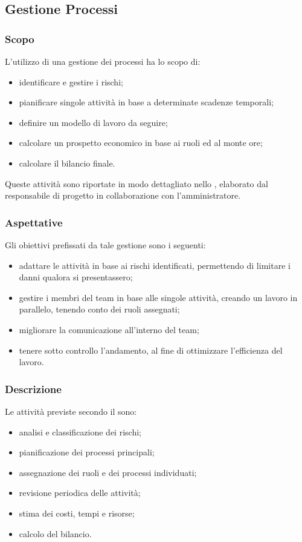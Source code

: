 \subsection{Gestione Processi}

	\subsubsection{Scopo}
	L'utilizzo di una gestione dei processi ha lo scopo di:
	\begin{itemize}
		\item identificare e gestire i rischi;
		\item pianificare singole attività in base a determinate scadenze temporali;
		\item definire un modello di lavoro da seguire;
		\item calcolare un prospetto economico in base ai ruoli ed al monte ore;
		\item calcolare il bilancio finale.
	\end{itemize}
	Queste attività sono riportate in modo dettagliato nello , elaborato dal responsabile di progetto in collaborazione con l'amministratore.
	
	\subsubsection{Aspettative}
	Gli obiettivi prefissati da tale gestione sono i seguenti:
	\begin{itemize}
		\item adattare le attività in base ai rischi identificati, permettendo di limitare i danni qualora si presentassero;
		\item gestire i membri del team in base alle singole attività, creando un lavoro in parallelo, tenendo conto dei ruoli assegnati;
		\item migliorare la comunicazione all'interno del team;
		\item tenere sotto controllo l'andamento, al fine di ottimizzare l'efficienza del lavoro.
	\end{itemize}

	\subsubsection{Descrizione}
	Le attività previste secondo il  sono:
	\begin{itemize}
		\item analisi e classificazione dei rischi;
		\item pianificazione dei processi principali;
		\item assegnazione dei ruoli e dei processi individuati;
		\item revisione periodica delle attività;
		\item stima dei costi, tempi e risorse;
		\item calcolo del bilancio.	 
	\end{itemize}

